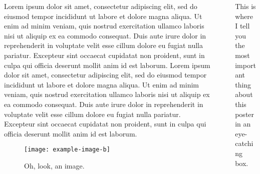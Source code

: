 \documentclass[20pt]{beamer}
\newlength{\sepwidth}
\newlength{\colwidth}
\newcommand{\separatorcolumn}{\begin{column}{\sepwidth}\end{column}}
\newlength{\bigcolwidth}
\newlength{\smallcolwidth}
\begin{document}
\begin{frame}[t]
\begin{columns}[t]
\begin{column}{\smallcolwidth}
\begin{tcolorbox}[title=Etwas]
Lorem ipsum dolor sit amet, consectetur adipiscing elit, sed do eiusmod tempor incididunt ut labore et dolore magna aliqua. 
Ut enim ad minim veniam, quis nostrud exercitation ullamco laboris nisi ut aliquip ex ea commodo consequat. 
Duis aute irure dolor in reprehenderit in voluptate velit esse cillum dolore eu fugiat nulla pariatur. 
Excepteur sint occaecat cupidatat non proident, sunt in culpa qui officia deserunt mollit anim id est laborum. 
Lorem ipsum dolor sit amet, consectetur adipiscing elit, sed do eiusmod tempor incididunt ut labore et dolore magna aliqua. 
Ut enim ad minim veniam, quis nostrud exercitation ullamco laboris nisi ut aliquip ex ea commodo consequat. 
Duis aute irure dolor in reprehenderit in voluptate velit esse cillum dolore eu fugiat nulla pariatur. 
Excepteur sint occaecat cupidatat non proident, sunt in culpa qui officia deserunt mollit anim id est laborum.

\begin{figure}[htb]
\centering
\texttt{[image: example-image-b]}
\caption{Oh, look, an image.}
\end{figure}

\end{tcolorbox}

\end{column}
\separatorcolumn
\begin{column}{\bigcolwidth}

\begin{tcolorbox}[title=\LARGE{Take-Home Message}, every float=\centering, colframe=black]
\Large{
This is where I tell you the most important thing about this poster in an eye-catching box.
}
\end{tcolorbox}

\vspace{0.15in}


\end{column}
\end{columns}
\end{frame}
\end{document}
